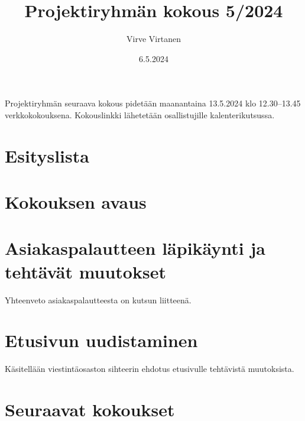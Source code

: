 \documentclass[agenda]{sfs-2487-2024}
\date{6.5.2024}
\author{Virve Virtanen}
\title{Projektiryhmän kokous 5/2024}
\begin{document}
\maketitle

Projektiryhmän seuraava kokous pidetään maanantaina 13.5.2024
klo 12.30--13.45 verkkokokouksena. Kokouslinkki lähetetään
osallistujille kalenterikutsussa.

\section*{Esityslista}

\section{Kokouksen avaus}

\section{Asiakaspalautteen läpikäynti ja tehtävät muutokset}

Yhteenveto asiakaspalautteesta on kutsun liitteenä.

\section{Etusivun uudistaminen}

Käsitellään viestintäosaston sihteerin ehdotus etusivulle
tehtävistä muutoksista.

\section{Seuraavat kokoukset}

\vspace{\parskip}




\vspace{\parskip}

\makecontactinfo
\end{document}
